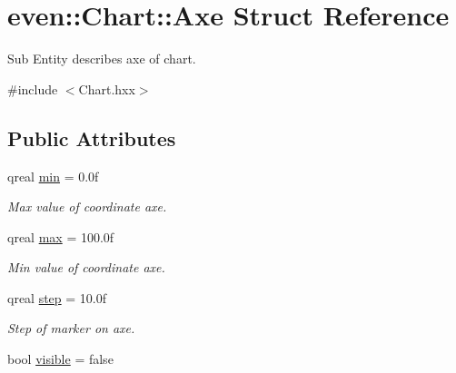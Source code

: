 \hypertarget{structeven_1_1_chart_1_1_axe}{}\section{even\+:\+:Chart\+:\+:Axe Struct Reference}
\label{structeven_1_1_chart_1_1_axe}


Sub Entity describes axe of chart.  




{\ttfamily \#include $<$Chart.\+hxx$>$}

\subsection*{Public Attributes}
\begin{DoxyCompactItemize}
\item 
\mbox{\label{structeven_1_1_chart_1_1_axe_a1e5726d92d3848b04bcfa4b7625b0c85}} 
qreal \mbox{\hyperlink{structeven_1_1_chart_1_1_axe_a1e5726d92d3848b04bcfa4b7625b0c85}{min}} = 0.\+0f
\begin{DoxyCompactList}\small\item\em Max value of coordinate axe. \end{DoxyCompactList}\item 
\mbox{\label{structeven_1_1_chart_1_1_axe_ac9455385e99d982342cb004a1f79d092}} 
qreal \mbox{\hyperlink{structeven_1_1_chart_1_1_axe_ac9455385e99d982342cb004a1f79d092}{max}} = 100.\+0f
\begin{DoxyCompactList}\small\item\em Min value of coordinate axe. \end{DoxyCompactList}\item 
\mbox{\label{structeven_1_1_chart_1_1_axe_ad04a87227b96397047afc77cacd0ff17}} 
qreal \mbox{\hyperlink{structeven_1_1_chart_1_1_axe_ad04a87227b96397047afc77cacd0ff17}{step}} = 10.\+0f
\begin{DoxyCompactList}\small\item\em Step of marker on axe. \end{DoxyCompactList}\item 
\mbox{\label{structeven_1_1_chart_1_1_axe_a3069332e93c5db786719a9e7855c9eb7}} 
bool \mbox{\hyperlink{structeven_1_1_chart_1_1_axe_a3069332e93c5db786719a9e7855c9eb7}{visible}} = false

\end{DoxyCompactItemize}
